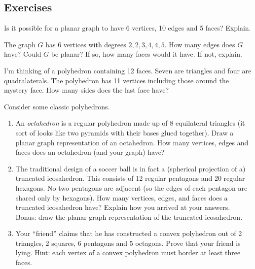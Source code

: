 \documentclass[10pt,]{book}
\theoremstyle{plain}
\theoremstyle{definition}
\theoremstyle{definition}
\theoremstyle{definition}
\theoremstyle{definition}
\numberwithin{equation}{chapter}
\begin{document}
\subsection*{Exercises}\label{exercises_gt-planar}
\begin{divisionexercise}{1}\hypertarget{exercise-20}{}
\hypertarget{p-223}{}%
Is it possible for a planar graph to have 6 vertices, 10 edges and 5 faces? Explain.%
\end{divisionexercise}%
\begin{divisionexercise}{2}\hypertarget{exercise-21}{}
\hypertarget{p-225}{}%
The graph \(G\) has 6 vertices with degrees \(2, 2, 3, 4, 4, 5\). How many edges does \(G\) have? Could \(G\) be planar? If so, how many faces would it have.  If not, explain.%
\end{divisionexercise}%
\begin{divisionexercise}{3}\hypertarget{exercise-22}{}
\hypertarget{p-227}{}%
I'm thinking of a polyhedron containing 12 faces. Seven are triangles and four are quadralaterals. The polyhedron has 11 vertices including those around the mystery face. How many sides does the last face have?%
\end{divisionexercise}%
\begin{divisionexercise}{4}\hypertarget{exercise-23}{}
\hypertarget{p-229}{}%
Consider some classic polyhedrons. \leavevmode%
\begin{enumerate}[label=(\alph*)]
\item\hypertarget{li-73}{}\hypertarget{p-230}{}%
An \emph{octahedron} is a regular polyhedron made up of 8 equilateral triangles (it sort of looks like two pyramids with their bases glued together). Draw a planar graph representation of an octahedron. How many vertices, edges and faces does an octahedron (and your graph) have? %
\item\hypertarget{li-74}{}\hypertarget{p-231}{}%
The traditional design of a soccer ball is in fact a (spherical projection of a) truncated icosahedron. This consists of 12 regular pentagons and 20 regular hexagons. No two pentagons are adjacent (so the edges of each pentagon are shared only by hexagons). How many vertices, edges, and faces does a truncated icosahedron have? Explain how you arrived at your answers. Bonus: draw the planar graph representation of the truncated icosahedron. %
\item\hypertarget{li-75}{}\hypertarget{p-232}{}%
Your ``friend'' claims that he has constructed a convex polyhedron out of 2 triangles, 2 squares, 6 pentagons and 5 octagons. Prove that your friend is lying. Hint: each vertex of a convex polyhedron must border at least three faces. %
\end{enumerate}
%
\end{divisionexercise}%
\end{document}
